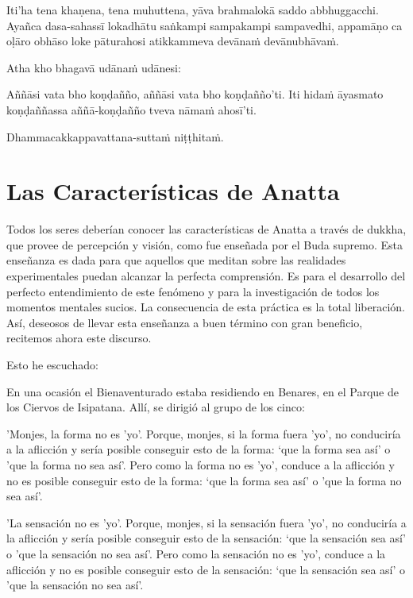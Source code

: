 Iti'ha tena khaṇena, tena muhuttena, yāva brahmalokā saddo abbhuggacchi.
Ayañca dasa-sahassī lokadhātu saṅkampi sampakampi sampavedhi, appamāṇo ca
oḷāro obhāso loke pāturahosi atikkammeva devānaṁ devānubhāvaṁ.

Atha kho bhagavā udānaṁ udānesi:

Aññāsi vata bho koṇḍañño, aññāsi vata bho koṇḍañño'ti. Iti hidaṁ āyasmato
koṇḍaññassa aññā-koṇḍañño tveva nāmaṁ ahosī'ti.

Dhammacakkappavattana-suttaṁ niṭṭhitaṁ.

\chapterTocDelegatePageNumber
\chapter{Las Características de Anatta}

\setTocDelegatedPageNumber
\englishText
\renewcommand{\englishTitle}{Las Características de Anatta}

\begin{leader}

Todos los seres deberían conocer las características de Anatta a través de dukkha, que provee de percepción y visión, como fue enseñada por el Buda supremo.
Esta enseñanza es dada para que aquellos que meditan sobre las realidades experimentales puedan alcanzar la perfecta comprensión.
Es para el desarrollo del perfecto entendimiento de este fenómeno y para la investigación de todos los momentos mentales sucios.
La consecuencia de esta práctica es la total liberación. Así, deseosos de llevar esta enseñanza a buen término con gran beneficio, recitemos ahora este discurso.

\end{leader}

Esto he escuchado:

En una ocasión el Bienaventurado estaba residiendo en Benares, en el Parque de los Ciervos de Isipatana. Allí, se dirigió al grupo de los cinco: 

'Monjes, la forma no es 'yo'. Porque, monjes, si la forma fuera 'yo', no conduciría a la aflicción y sería posible conseguir esto de la forma: ‘que la forma sea así' o 'que la forma no sea así’. Pero como la forma no es 'yo', conduce a la aflicción y no es posible conseguir esto de la forma: ‘que la forma sea así' o 'que la forma no sea así’.

'La sensación no es 'yo'. Porque, monjes, si la sensación fuera 'yo', no conduciría a la aflicción y sería posible conseguir esto de la sensación: ‘que la sensación sea así' o 'que la sensación no sea así’. Pero como la sensación no es 'yo', conduce a la aflicción y no es posible conseguir esto de la sensación: ‘que la sensación sea así' o 'que la sensación no sea así’.

